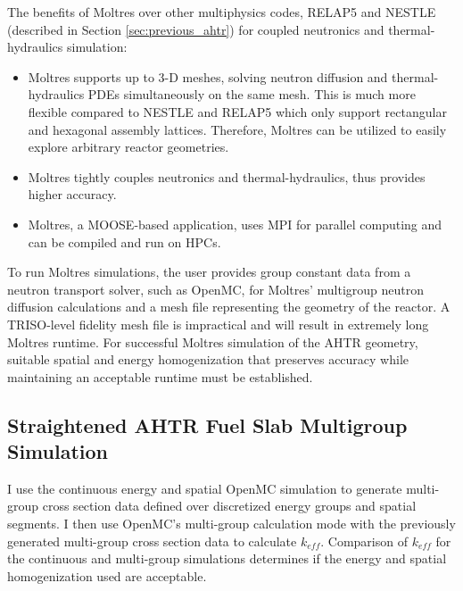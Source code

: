The benefits of Moltres over other multiphysics codes, RELAP5 and NESTLE 
(described in Section \ref{sec:previous_ahtr}) for coupled neutronics and 
thermal-hydraulics simulation: 
\begin{itemize}
  \item Moltres supports up to 3-D meshes, solving neutron diffusion and 
  thermal-hydraulics \glspl{PDE} simultaneously on the same mesh. This is much 
  more flexible compared to \gls{NESTLE} and RELAP5 which only support 
  rectangular and hexagonal assembly lattices. Therefore, Moltres can be utilized 
  to easily explore arbitrary reactor geometries.
  \item Moltres tightly couples neutronics and thermal-hydraulics, thus 
  provides higher accuracy. 
  \item Moltres, a \gls{MOOSE}-based application, uses MPI for parallel computing 
  and can be compiled and run on \glspl{HPC}. 
\end{itemize}

To run Moltres simulations, the user provides group constant data from a neutron 
transport solver, such as OpenMC, for Moltres' multigroup neutron diffusion 
calculations and a mesh file representing the geometry of the reactor. 
A TRISO-level fidelity mesh file is impractical and will result in extremely 
long Moltres runtime. 
For successful Moltres simulation of the \gls{AHTR} geometry, suitable spatial 
and energy homogenization that preserves accuracy while maintaining an acceptable 
runtime must be established. 

\subsection{Straightened AHTR Fuel Slab Multigroup Simulation}
I use the continuous energy and spatial OpenMC simulation to generate 
multi-group cross section data defined over discretized energy groups 
and spatial segments. 
I then use OpenMC's multi-group calculation mode with the previously generated 
multi-group cross section data to calculate $k_{eff}$. 
Comparison of $k_{eff}$ for the continuous and multi-group simulations
determines if the energy and spatial homogenization used are acceptable. 

